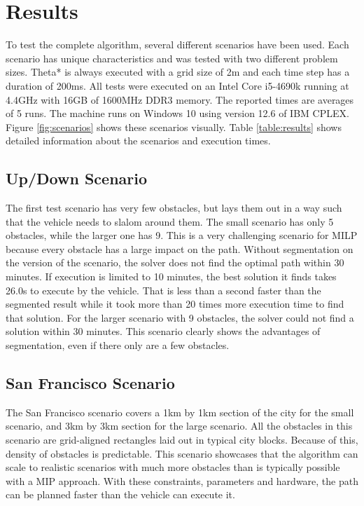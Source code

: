 \section{Results}
To test the complete algorithm, several different scenarios have been used. Each scenario has unique characteristics and was tested with two different problem sizes. Theta* is always executed with a grid size of 2m and each time step has a duration of 200ms. All tests were executed on an Intel Core i5-4690k running at 4.4GHz with 16GB of 1600MHz DDR3 memory. The reported times are averages of 5 runs. The machine runs on Windows 10 using version 12.6 of IBM CPLEX. Figure \ref{fig:scenarios} shows these scenarios visually. Table \ref{table:results} shows detailed information about the scenarios and execution times.

\subsection{Up/Down Scenario}
The first test scenario has very few obstacles, but lays them out in a way such that the vehicle needs to slalom around them. The small scenario has only 5 obstacles, while the larger one has 9. This is a very challenging scenario for MILP because every obstacle has a large impact on the path. Without segmentation on the version of the scenario, the solver does not find the optimal path within 30 minutes. If execution is limited to 10 minutes, the best solution it finds takes 26.0s to execute by the vehicle. That is less than a second faster than the segmented result while it took more than 20 times more execution time to find that solution. For the larger scenario with 9 obstacles, the solver could not find a solution within 30 minutes. This scenario clearly shows the advantages of segmentation, even if there only are a few obstacles.

\subsection{San Francisco Scenario}
The San Francisco scenario covers a 1km by 1km section of the city for the small scenario, and 3km by 3km section for the large scenario. All the obstacles in this scenario are grid-aligned rectangles laid out in typical city blocks. Because of this, density of obstacles is predictable. This scenario showcases that the algorithm can scale to realistic scenarios with much more obstacles than is typically possible with a MIP approach. With these constraints, parameters and hardware, the path can be planned faster than the vehicle can execute it.

